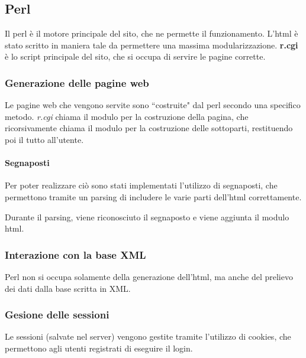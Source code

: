 \subsection{Perl}
Il perl \`e il motore principale del sito, che ne permette il funzionamento. L'html \`e stato scritto in maniera tale da permettere una massima modularizzazione. \textbf{r.cgi} \`e lo script principale del sito, che si occupa di servire le pagine corrette.
\subsubsection{Generazione delle pagine web}
Le pagine web che vengono servite sono ``costruite" dal perl secondo una specifico metodo. \textit{r.cgi} chiama il modulo per la costruzione della pagina, che ricorsivamente chiama il modulo per la costruzione delle sottoparti, restituendo poi il tutto all'utente.
\paragraph*{Segnaposti} Per poter realizzare ci\`o sono stati implementati l'utilizzo di segnaposti, che permettono tramite un parsing di includere le varie parti dell'html correttamente.

Durante il parsing, viene riconosciuto il segnaposto e viene aggiunta il modulo html.
\subsubsection{Interazione con la base XML}
Perl non si occupa solamente della generazione dell'html, ma anche del prelievo dei dati dalla base scritta in XML.
\subsubsection{Gesione delle sessioni}
Le sessioni (salvate nel server) vengono gestite tramite l'utilizzo di cookies, che permettono agli utenti registrati di eseguire il login.
